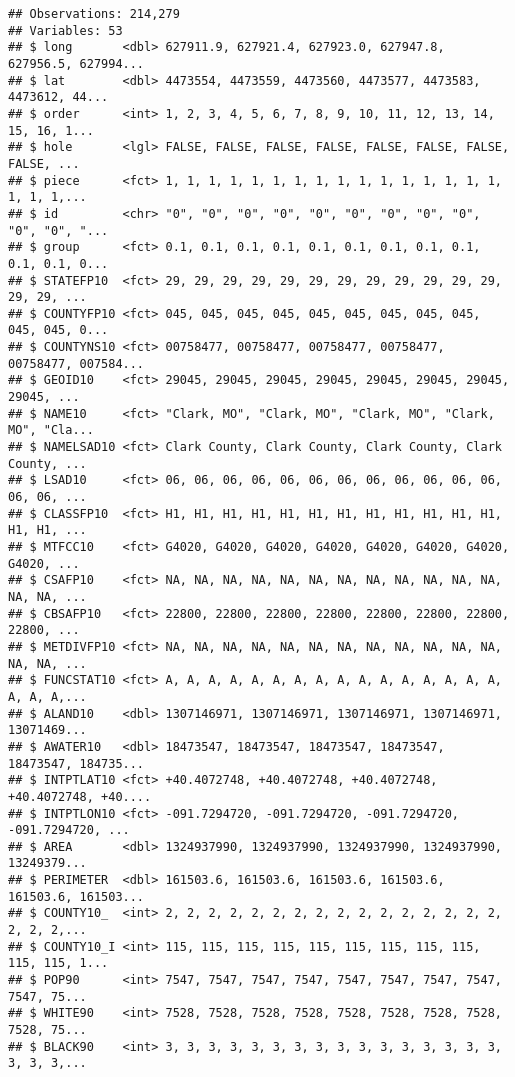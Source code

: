 \documentclass[]{book}
\begin{document}
\begin{verbatim}
## Observations: 214,279
## Variables: 53
## $ long       <dbl> 627911.9, 627921.4, 627923.0, 627947.8, 627956.5, 627994...
## $ lat        <dbl> 4473554, 4473559, 4473560, 4473577, 4473583, 4473612, 44...
## $ order      <int> 1, 2, 3, 4, 5, 6, 7, 8, 9, 10, 11, 12, 13, 14, 15, 16, 1...
## $ hole       <lgl> FALSE, FALSE, FALSE, FALSE, FALSE, FALSE, FALSE, FALSE, ...
## $ piece      <fct> 1, 1, 1, 1, 1, 1, 1, 1, 1, 1, 1, 1, 1, 1, 1, 1, 1, 1, 1,...
## $ id         <chr> "0", "0", "0", "0", "0", "0", "0", "0", "0", "0", "0", "...
## $ group      <fct> 0.1, 0.1, 0.1, 0.1, 0.1, 0.1, 0.1, 0.1, 0.1, 0.1, 0.1, 0...
## $ STATEFP10  <fct> 29, 29, 29, 29, 29, 29, 29, 29, 29, 29, 29, 29, 29, 29, ...
## $ COUNTYFP10 <fct> 045, 045, 045, 045, 045, 045, 045, 045, 045, 045, 045, 0...
## $ COUNTYNS10 <fct> 00758477, 00758477, 00758477, 00758477, 00758477, 007584...
## $ GEOID10    <fct> 29045, 29045, 29045, 29045, 29045, 29045, 29045, 29045, ...
## $ NAME10     <fct> "Clark, MO", "Clark, MO", "Clark, MO", "Clark, MO", "Cla...
## $ NAMELSAD10 <fct> Clark County, Clark County, Clark County, Clark County, ...
## $ LSAD10     <fct> 06, 06, 06, 06, 06, 06, 06, 06, 06, 06, 06, 06, 06, 06, ...
## $ CLASSFP10  <fct> H1, H1, H1, H1, H1, H1, H1, H1, H1, H1, H1, H1, H1, H1, ...
## $ MTFCC10    <fct> G4020, G4020, G4020, G4020, G4020, G4020, G4020, G4020, ...
## $ CSAFP10    <fct> NA, NA, NA, NA, NA, NA, NA, NA, NA, NA, NA, NA, NA, NA, ...
## $ CBSAFP10   <fct> 22800, 22800, 22800, 22800, 22800, 22800, 22800, 22800, ...
## $ METDIVFP10 <fct> NA, NA, NA, NA, NA, NA, NA, NA, NA, NA, NA, NA, NA, NA, ...
## $ FUNCSTAT10 <fct> A, A, A, A, A, A, A, A, A, A, A, A, A, A, A, A, A, A, A,...
## $ ALAND10    <dbl> 1307146971, 1307146971, 1307146971, 1307146971, 13071469...
## $ AWATER10   <dbl> 18473547, 18473547, 18473547, 18473547, 18473547, 184735...
## $ INTPTLAT10 <fct> +40.4072748, +40.4072748, +40.4072748, +40.4072748, +40....
## $ INTPTLON10 <fct> -091.7294720, -091.7294720, -091.7294720, -091.7294720, ...
## $ AREA       <dbl> 1324937990, 1324937990, 1324937990, 1324937990, 13249379...
## $ PERIMETER  <dbl> 161503.6, 161503.6, 161503.6, 161503.6, 161503.6, 161503...
## $ COUNTY10_  <int> 2, 2, 2, 2, 2, 2, 2, 2, 2, 2, 2, 2, 2, 2, 2, 2, 2, 2, 2,...
## $ COUNTY10_I <int> 115, 115, 115, 115, 115, 115, 115, 115, 115, 115, 115, 1...
## $ POP90      <int> 7547, 7547, 7547, 7547, 7547, 7547, 7547, 7547, 7547, 75...
## $ WHITE90    <int> 7528, 7528, 7528, 7528, 7528, 7528, 7528, 7528, 7528, 75...
## $ BLACK90    <int> 3, 3, 3, 3, 3, 3, 3, 3, 3, 3, 3, 3, 3, 3, 3, 3, 3, 3, 3,...

\end{verbatim}
\end{document}

